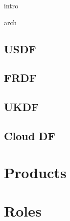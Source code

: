  {intro}

 {arch}






\subsection{USDF}
\subsection{FRDF}
\subsection{UKDF}
\subsection{Cloud DF}

\section{Products}

\section{Roles}
